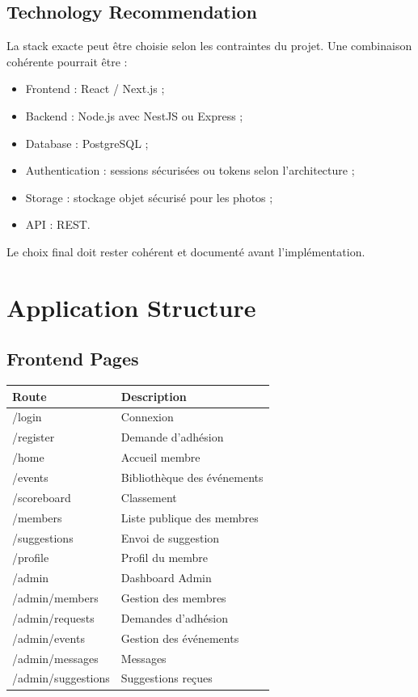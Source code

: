 \documentclass[11pt,a4paper]{report}
\begin{document}
\section{Technology Recommendation}

La stack exacte peut être choisie selon les contraintes du projet. Une combinaison cohérente pourrait être :

\begin{itemize}
    \item Frontend : React / Next.js ;
    \item Backend : Node.js avec NestJS ou Express ;
    \item Database : PostgreSQL ;
    \item Authentication : sessions sécurisées ou tokens selon l'architecture ;
    \item Storage : stockage objet sécurisé pour les photos ;
    \item API : REST.
\end{itemize}

Le choix final doit rester cohérent et documenté avant l'implémentation.

\chapter{Application Structure}

\section{Frontend Pages}

\begin{longtable}{p{}p{}}
\toprule
\textbf{Route} & \textbf{Description}\\
\midrule
/login & Connexion\\
/register & Demande d'adhésion\\
/home & Accueil membre\\
/events & Bibliothèque des événements\\
/scoreboard & Classement\\
/members & Liste publique des membres\\
/suggestions & Envoi de suggestion\\
/profile & Profil du membre\\
/admin & Dashboard Admin\\
/admin/members & Gestion des membres\\
/admin/requests & Demandes d'adhésion\\
/admin/events & Gestion des événements\\
/admin/messages & Messages\\
/admin/suggestions & Suggestions reçues\\
\bottomrule
\end{longtable}
\end{document}
